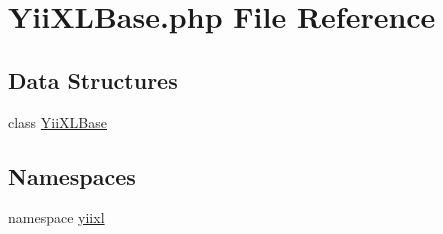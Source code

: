 \hypertarget{YiiXLBase_8php}{
\section{YiiXLBase.php File Reference}
\label{YiiXLBase_8php}
}
\subsection*{Data Structures}
\begin{DoxyCompactItemize}
\item 
class \hyperlink{classYiiXLBase}{YiiXLBase}
\end{DoxyCompactItemize}
\subsection*{Namespaces}
\begin{DoxyCompactItemize}
\item 
namespace \hyperlink{namespaceyiixl}{yiixl}
\end{DoxyCompactItemize}
